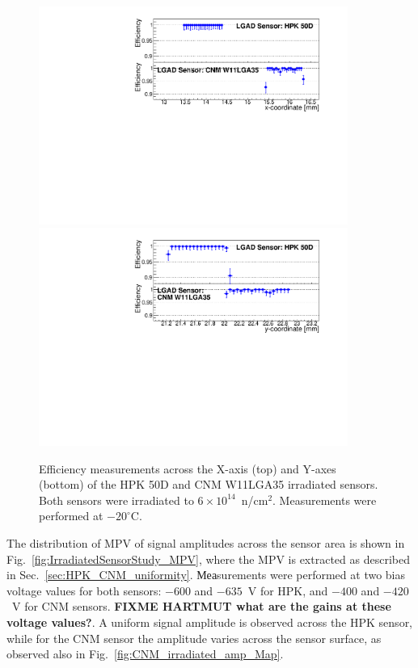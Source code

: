 \documentclass[preprint,1p]{elsarticle}
\begin{document}
\begin{figure}[htbp] 
\centering
\includegraphics[width=0.90\textwidth]{figs/USCSBoard_HPK50DIrradiated-CNMW11LGA35_Run936-961/IrradiatedSensorStudy_Efficiency_vs_X.pdf} 
\includegraphics[width=0.90\textwidth]{figs/USCSBoard_HPK50DIrradiated-CNMW11LGA35_Run936-961/IrradiatedSensorStudy_Efficiency_vs_Y.pdf} 
\caption{Efficiency measurements across the X-axis (top) and Y-axes (bottom) of the HPK 50D and CNM W11LGA35 irradiated sensors. Both sensors were irradiated to $6\times 10^{14}$~n/cm$^2$. Measurements were performed at $-20^{\circ}$C.} 
\label{fig:IrradiatedSensorStudy_Efficiency} 
\end{figure} 

The distribution of MPV of signal amplitudes across the sensor area is shown in
Fig.~\ref{fig:IrradiatedSensorStudy_MPV}, where the MPV is extracted as
described in Sec.~\ref{sec:HPK_CNM_uniformity}. Меаsurements were performed at
two bias voltage values for both sensors: $-600$ and $-635$~V for HPK, and
$-400$ and $-420$~V for CNM sensors. \textbf{FIXME HARTMUT what are the gains at
these voltage values?}. A uniform signal amplitude is observed across the HPK
sensor, while for the CNM sensor the amplitude varies across the sensor surface,
as observed also in Fig.~\ref{fig:CNM_irradiated_amp_Map}. 
\end{document}
